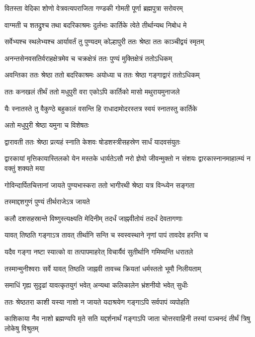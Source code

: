 \twolineshloka
{वितस्ता वेदिका शोणो वेत्रवत्यपराजिता}
{गण्डकी गोमती पूर्णा ब्रह्मपुत्रा सरोवरम्} %

\twolineshloka
{वाग्मती च शतद्रुश्च तथा बदरिकाश्रमः}
{दुर्लभाः कार्तिके त्वेते तीर्थान्यथ निबोध मे} %

\twolineshloka
{सर्वेभ्यश्च स्थलेभ्यश्च आर्यावर्तं तु पुण्यदम्}
{कोल्हापुरी ततः श्रेष्ठा ततः काञ्चीद्वयं स्मृतम्} %

\twolineshloka
{अनन्तसेनवसतिर्वराहक्षेत्रमेव च}
{चक्रक्षेत्रं ततः पुण्यं मुक्तिक्षेत्रं ततोऽधिकम्} %

\twolineshloka
{अवन्तिका ततः श्रेष्ठा ततो बदरिकाश्रमः}
{अयोध्या च ततः श्रेष्ठा गङ्गाद्वारं ततोऽधिकम्} %

\twolineshloka
{ततः कनखलं तीर्थं ततो मधुपुरी वरा}
{एकोऽपि कार्तिको मासो मथुरायमुनाजले} %

\twolineshloka
{यैः स्नातस्ते तु वैकुण्ठे बहुकालं वसन्ति हि}
{राधादामोदरस्तत्र स्वयं स्नातस्तु कार्तिके} %


\onelineshloka
{अतो मधुपुरी श्रेष्ठा यमुना च विशेषतः} %

\twolineshloka
{द्वारावती ततः श्रेष्ठा प्रत्यहं स्नाति केशवः}
{षोडशस्त्रीसहस्रेण सार्धं यादवसंयुतः} %

\threelineshloka
{द्वारकायां मृत्तिकायास्तिलको येन मस्तके}
{धार्यतेऽसौ नरो ज्ञेयो जीवन्मुक्तो न संशयः}
{द्वारकास्नानमाहात्म्यं न वक्तुं शक्यते मया} %

\twolineshloka
{गोविन्दार्पितचित्तानां जायते पुण्यभास्करा}
{ततो भागीरथी श्रेष्ठा यत्र विन्ध्येन सङ्गता} %


\onelineshloka
{तस्माद्दशगुणं पुण्यं तीर्थराजेऽत्र जायते} %

\twolineshloka
{कलौ दशसहस्रान्ते विष्णुस्त्यक्ष्यति मेदिनीम्}
{तदर्धं जाह्नवीतोयं तदर्धं देवतागणाः} %

\twolineshloka
{यावत् तिष्ठति गङ्गाऽत्र तावत् तीर्थानि सन्ति च}
{स्वस्वस्थाने नृणां पापं तावदेव हरन्ति च} %

\twolineshloka
{यदैव गङ्गा नष्टा स्यात्को वा तत्पापमाहरेत्}
{विचार्यैवं सुतीर्थानि गमिष्यन्ति धरातले} %

\twolineshloka
{तस्मान्मुनीश्वराः सर्वे यावत् तिष्ठति जाह्नवी}
{तावच्च क्रियतां धर्मस्ततो भूमौ निलीयताम्} %

\twolineshloka
{समाधिं गृह्य सुदृढां यावत्कृतयुगं भवेत्}
{अन्यथा कलिकालेन भ्रंशनीयो भवेत् सुधीः} %

\twolineshloka
{ततः श्रेष्ठतरा काशी यस्या नाशो न जायते}
{यदाश्रयेण गङ्गाऽपि सर्वपापं व्यपोहति} %

\threelineshloka
{काशिकाया नैव नाशो ब्रह्मण्यपि मृते सति}
{यद्दर्शनार्थं गङ्गाऽपि जाता चोत्तरवाहिनी}
{तस्यां पञ्चनदं तीर्थं त्रिषु लोकेषु विश्रुतम्} %

